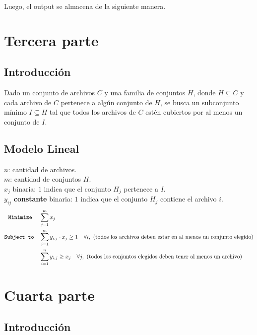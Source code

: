 \documentclass[11pt, a4paper, pdftex]{article}
\begin{document}
Luego, el output se almacena de la siguiente manera.



\section{Tercera parte}

\subsection{Introducción}

Dado un conjunto de archivos $C$ y una familia de conjuntos $H$, donde
$H \subseteq C$ y cada archivo de $C$ pertenece a algún conjunto de $H$,
se busca un subconjunto mínimo $I \subseteq H$ tal que todos los
archivos de $C$ estén cubiertos por al menos un conjunto de $I$.

\subsection{Modelo Lineal}

$n$: cantidad de archivos. \\

$m$: cantidad de conjuntos \( H \). \\

$x_{j}$ binaria: $1$ indica que el conjunto $H_{j}$ pertenece a $I$. \\ 

$y_{ij}$ \textbf{constante} binaria: $1$ indica que el conjunto $H_{j}$
contiene el archivo $i$. \\ 

\begin{alignat*}{2}
    \minimize & \sum_{j = 1}^{m} x_{j}\\
    \subjto   & \sum_{j=1}^{m} y_{i,j} \cdot x_j \geq 1 \quad \forall i,\ \text{(todos los archivos deben estar en al menos un conjunto elegido)}\\
              & \sum_{i=1}^{n} y_{i,j} \geq x_j \quad \forall j,\ \text{(todos los conjuntos elegidos deben tener al menos un archivo)}
\end{alignat*}

\section{Cuarta parte}

\subsection{Introducción}
\end{document}
